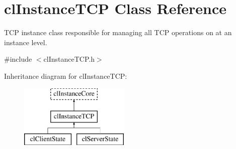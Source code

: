 \hypertarget{classcl_instance_t_c_p}{
\section{clInstanceTCP Class Reference}
\label{classcl_instance_t_c_p}
}


TCP instance class responsible for managing all TCP operations on at an instance level.  




{\ttfamily \#include $<$clInstanceTCP.h$>$}

Inheritance diagram for clInstanceTCP:\begin{figure}[H]
\begin{center}
\leavevmode
\includegraphics[height=3.000000cm]{classcl_instance_t_c_p}
\end{center}
\end{figure}
